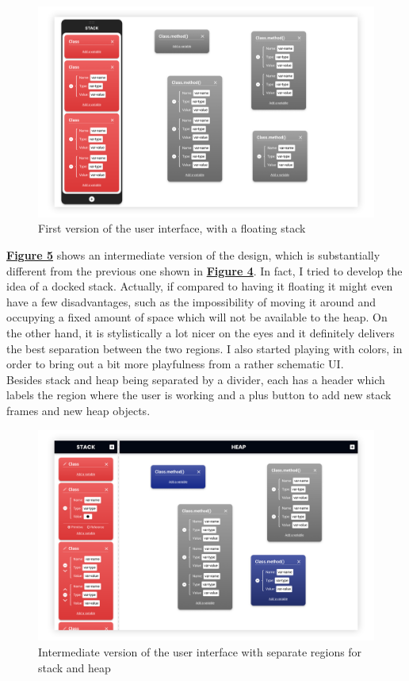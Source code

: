 \documentclass[]{usiinfbachelorproject}
\begin{document}
\begin{figure}[h!]
\centering
\includegraphics[width=\textwidth]{figures/floating_stack.png}
\caption {First version of the user interface, with a floating stack}
\label{floating stack}
\end{figure}

\pagebreak

\noindent \hyperref[separate regions]{\textbf{Figure 5}} shows an intermediate version of the design, which is substantially different from the previous one shown in \hyperref[floating stack]{\textbf{Figure 4}}. In fact, I tried to develop the idea of a docked stack. Actually, if compared to having it floating it might even have a few disadvantages, such as the impossibility of moving it around and occupying a fixed amount of space which will not be available to the heap. On the other hand, it is stylistically a lot nicer on the eyes and it definitely delivers the best separation between the two regions. I also started playing with colors, in order to bring out a bit more playfulness from a rather schematic UI.\\
Besides stack and heap being separated by a divider, each has a header which labels the region where the user is working and a plus button to add new stack frames and new heap objects.

\begin{figure}[h!]
\centering
\includegraphics[width=\textwidth]{figures/separate_regions.png}
\caption {Intermediate version of the user interface with separate regions for stack and heap}
\label{separate regions}
\end{figure}
\end{document}
